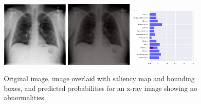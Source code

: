 \documentclass[12pt,oneside,a4paper]{report}
\begin{document}
\begin{figure}[H]
  \centering
  \includegraphics[width=0.3\textwidth]{images/preds/no_finding}\hspace{0.01\textwidth}%
  \includegraphics[width=0.3\textwidth]{images/preds/no_finding_cam}\hspace{0.01\textwidth}%
  \includegraphics[width=0.3\textwidth]{images/preds/no_finding_probs}\\[0.01\textwidth]
  \caption{Original image, image overlaid with saliency map and bounding boxes,
    and predicted probabilities for an x-ray image showing no abnormalities.}
  \label{examples_15}
\end{figure}
\end{document}
